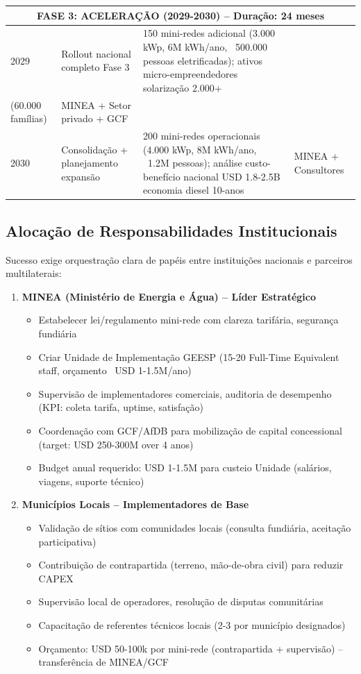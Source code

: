 \documentclass[12pt, a4paper]{article}
\begin{document}
{{{{{{{{{{{{{\begin{table}[H]
\begin{tabular}{|p{1.2cm}|p{3.2cm}|p{2.8cm}|p{2.5cm}|}
\hline
\multicolumn{4}{|c|}{\textbf{FASE 3: ACELERAÇÃO (2029-2030)} -- Duração: 24 meses} \\
\hline
2029 & Rollout nacional completo Fase 3 & 150 mini-redes adicional (3.000 kWp, 6M kWh/ano, ~500.000 pessoas eletrificadas); ativos micro-empreendedores solarização 2.000+ \\
(60.000 famílias) & MINEA + Setor privado + GCF \\
\hline
2030 & Consolidação + planejamento expansão & 200 mini-redes operacionais (4.000 kWp, 8M kWh/ano, ~1.2M pessoas); análise custo-benefício nacional USD 1.8-2.5B economia diesel 10-anos & MINEA + Consultores \\
\hline
\end{tabular}
\end{table}

\subsection{Alocação de Responsabilidades Institucionais}

Sucesso exige orquestração clara de papéis entre instituições nacionais e parceiros multilaterais:

\begin{enumerate}
\item \textbf{MINEA (Ministério de Energia e Água) -- Líder Estratégico}
   \begin{itemize}
   \item Estabelecer lei/regulamento mini-rede com clareza tarifária, segurança fundiária
   \item Criar Unidade de Implementação GEESP (15-20 Full-Time Equivalent staff, orçamento ~USD 1-1.5M/ano)
   \item Supervisão de implementadores comerciais, auditoria de desempenho (KPI: coleta tarifa, uptime, satisfação)
   \item Coordenação com GCF/AfDB para mobilização de capital concessional (target: USD 250-300M over 4 anos)
   \item Budget anual requerido: USD 1-1.5M para custeio Unidade (salários, viagens, suporte técnico)
   \end{itemize}

\item \textbf{Municípios Locais -- Implementadores de Base}
   \begin{itemize}
   \item Validação de sítios com comunidades locais (consulta fundiária, aceitação participativa)
   \item Contribuição de contrapartida (terreno, mão-de-obra civil) para reduzir CAPEX
   \item Supervisão local de operadores, resolução de disputas comunitárias
   \item Capacitação de referentes técnicos locais (2-3 por município designados)
   \item Orçamento: USD 50-100k por mini-rede (contrapartida + supervisão) -- transferência de MINEA/GCF
   \end{itemize}


\end{enumerate}}}}}}}}}}}}}}
\end{document}
